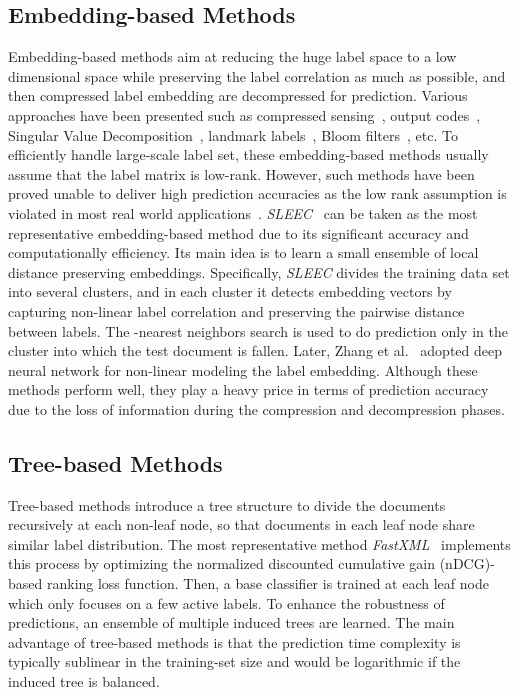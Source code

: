 \documentclass[runningheads]{llncs}
\begin{document}
\subsection{Embedding-based Methods}
Embedding-based methods aim at reducing the huge label space to a low dimensional space while preserving the label correlation as much as possible, and then compressed label embedding are decompressed for prediction. Various approaches have been presented such as compressed sensing~\cite{ref_article19}, output codes~\cite{ref_article20}, Singular Value Decomposition~\cite{ref_article21}, landmark labels~\cite{ref_article22}, Bloom filters~\cite{ref_article23}, etc. To efficiently handle large-scale label set, these embedding-based methods usually assume that the label matrix is low-rank. However, such methods have been proved unable to deliver high prediction accuracies as the low rank assumption is violated in most real world applications~\cite{ref_article9}. \textit{SLEEC}~\cite{ref_article9} can be taken as the most representative embedding-based method due to its significant accuracy and computationally efficiency. Its main idea is to learn a small ensemble of local distance preserving embeddings. Specifically, \textit{SLEEC} divides the training data set into several clusters, and in each cluster it detects embedding vectors by capturing non-linear label correlation and preserving the pairwise distance between labels. The -nearest neighbors search is used to do prediction only in the cluster into which the test document is fallen. Later, Zhang et al.~\cite{ref_article15} adopted deep neural network for non-linear modeling the label embedding. Although these methods perform well, they play a heavy price in terms of prediction accuracy due to the loss of information during the compression and decompression phases.

\vspace{-2mm}
\subsection{Tree-based Methods}
Tree-based methods introduce a tree structure to divide the documents recursively at each non-leaf node, so that documents in each leaf node share similar label distribution. The most representative method \textit{FastXML}~\cite{ref_article18} implements this process by optimizing the normalized discounted cumulative gain (nDCG)-based ranking loss function.
Then, a base classifier is trained at each leaf node which only focuses on a few active labels. To enhance the robustness of predictions, an ensemble of multiple induced trees are learned. The main advantage of tree-based methods is that the prediction time complexity is typically sublinear in the training-set size and would be logarithmic if the induced tree is balanced. 
\end{document}
